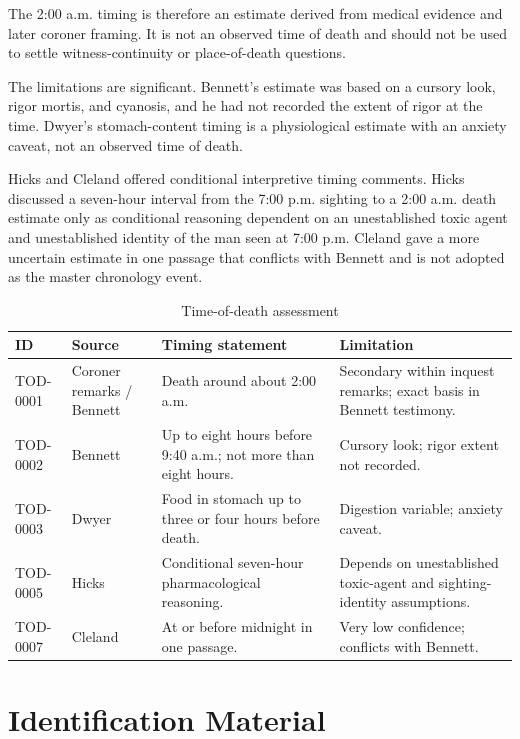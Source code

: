 The 2:00 a.m. timing is therefore an estimate derived from medical evidence and later coroner framing. It is not an observed time of death and should not be used to settle witness-continuity or place-of-death questions.

The limitations are significant. Bennett's estimate was based on a cursory look, rigor mortis, and cyanosis, and he had not recorded the extent of rigor at the time. Dwyer's stomach-content timing is a physiological estimate with an anxiety caveat, not an observed time of death.

Hicks and Cleland offered conditional interpretive timing comments. Hicks discussed a seven-hour interval from the 7:00 p.m. sighting to a 2:00 a.m. death estimate only as conditional reasoning dependent on an unestablished toxic agent and unestablished identity of the man seen at 7:00 p.m. Cleland gave a more uncertain estimate in one passage that conflicts with Bennett and is not adopted as the master chronology event.

\begin{table}[htbp]
\centering
\caption{Time-of-death assessment}
\label{tab:chapter9-time-of-death}
\begin{tabularx}{\textwidth}{>{\raggedright\arraybackslash}p{}>{\raggedright\arraybackslash}p{}>{\raggedright\arraybackslash}p{}>{\raggedright\arraybackslash}X}
\toprule
ID & Source & Timing statement & Limitation \\
\midrule
TOD-0001 & Coroner remarks / Bennett & Death around about 2:00 a.m. & Secondary within inquest remarks; exact basis in Bennett testimony. \\
TOD-0002 & Bennett & Up to eight hours before 9:40 a.m.; not more than eight hours. & Cursory look; rigor extent not recorded. \\
TOD-0003 & Dwyer & Food in stomach up to three or four hours before death. & Digestion variable; anxiety caveat. \\
TOD-0005 & Hicks & Conditional seven-hour pharmacological reasoning. & Depends on unestablished toxic-agent and sighting-identity assumptions. \\
TOD-0007 & Cleland & At or before midnight in one passage. & Very low confidence; conflicts with Bennett. \\
\bottomrule
\end{tabularx}
\end{table}

\section{Identification Material}

